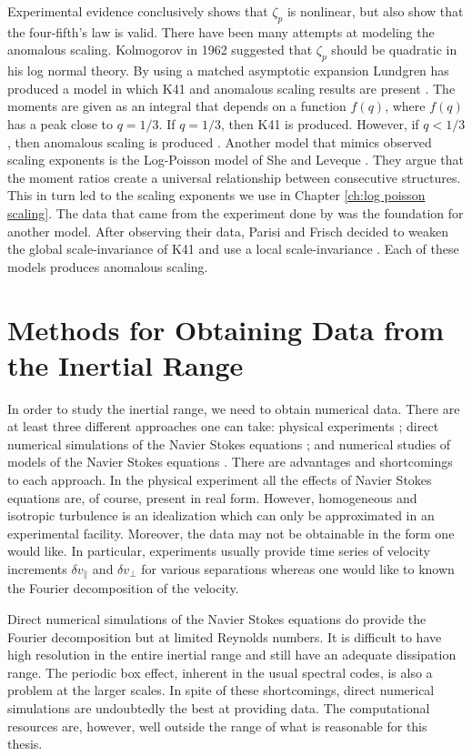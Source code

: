 Experimental evidence \cite{Anselmet, Noullez, VanAtta, Vincent} conclusively shows that $\zeta_p$ is nonlinear, but also show that the four-fifth's law is valid.  There have been many attempts at modeling the anomalous scaling.  Kolmogorov in 1962 suggested that $\zeta_p$ should be quadratic in his log normal theory.  By using a matched asymptotic expansion Lundgren has produced a model in which K41 and anomalous scaling results are present \cite{Lundgren}.  The moments are given as an integral that depends on a function $f(q)$, where $f(q)$ has a peak close to $q = 1/3$.  If $q = 1/3$, then K41 is produced.  However, if $q<1/3$, then anomalous scaling is produced \cite{Lundgren}.  Another model that mimics observed scaling exponents is the Log-Poisson model of She and Leveque \cite{She}.  They argue that the moment ratios create a universal relationship between consecutive structures. This in turn led to the scaling exponents we use in Chapter \ref{ch:log poisson scaling}.  The data that came from the experiment done by \cite{Anselmet} was the foundation for another model.  After observing their data, Parisi and Frisch decided to weaken the global scale-invariance of K41 and use a local scale-invariance \cite{Parisi}. Each of these models produces anomalous scaling.

\section{Methods for Obtaining Data from the Inertial Range}

In order to study the inertial range, we need to obtain numerical data.  There are at least three different approaches one can take: physical experiments \cite{YakhotNASA}; direct numerical simulations of the Navier Stokes equations \cite{Moser}; and numerical studies of models of the Navier Stokes equations \cite{Frisch}. There are advantages and shortcomings to each approach.  In the physical experiment all the effects of Navier Stokes equations are, of course, present in real form.  However, homogeneous and isotropic turbulence  is an idealization which can only be approximated in an experimental facility.  Moreover, the data may not be obtainable in the form one would like.  In particular, experiments usually provide time series of velocity increments $\delta v_{\parallel}$ and $\delta v_{\perp}$ for various separations whereas one would like to known the Fourier decomposition of the velocity.

Direct numerical simulations of the Navier Stokes equations do provide the Fourier decomposition but at limited Reynolds numbers.  It is difficult to have high resolution in the entire inertial range and still have an adequate dissipation range.  The periodic box effect, inherent in the usual spectral codes, is also a problem at the larger scales.  In spite of these shortcomings, direct numerical simulations are undoubtedly the best at providing data.  The computational resources are, however, well outside the range of what is reasonable for this thesis.

